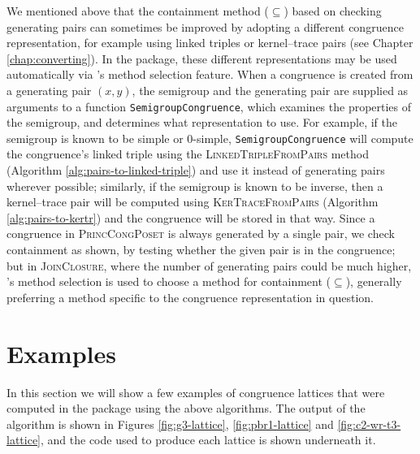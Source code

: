 We mentioned above that the containment method ($\subseteq$) based on checking
generating pairs can sometimes be improved by adopting a different congruence
representation, for example using linked triples or kernel--trace pairs (see
Chapter \ref{chap:converting}).  In the \Semigroups{} package, these different
representations may be used automatically via \GAP{}'s method selection feature.
When a congruence is created from a generating pair $(x,y)$, the semigroup and
the generating pair are supplied as arguments to a function
\texttt{SemigroupCongruence}, which examines the properties of the semigroup,
and determines what representation to use.  For example, if the semigroup is
known to be simple or 0-simple, \texttt{SemigroupCongruence} will compute the
congruence's linked triple using the \textsc{LinkedTripleFromPairs} method
(Algorithm \ref{alg:pairs-to-linked-triple}) and use it instead of generating
pairs wherever possible; similarly, if the semigroup is known to be inverse,
then a kernel--trace pair will be computed using \textsc{KerTraceFromPairs}
(Algorithm \ref{alg:pairs-to-kertr}) and the congruence will be stored in that
way.  Since a congruence in \textsc{PrincCongPoset} is always generated by a
single pair, we check containment as shown, by testing whether the given pair is
in the congruence; but in \textsc{JoinClosure}, where the number of generating
pairs could be much higher, \GAP{}'s method selection is used to choose a method
for containment ($\subseteq$), generally preferring a method specific to the
congruence representation in question.

\section{Examples}
\label{sec:lattice-examples}

In this section we will show a few examples of congruence lattices that were
computed in the \Semigroups{} package \cite{semigroups} using the above algorithms.
The output of the algorithm is shown in Figures \ref{fig:g3-lattice},
\ref{fig:pbr1-lattice} and \ref{fig:c2-wr-t3-lattice}, and the code used to
produce each lattice is shown underneath it.

